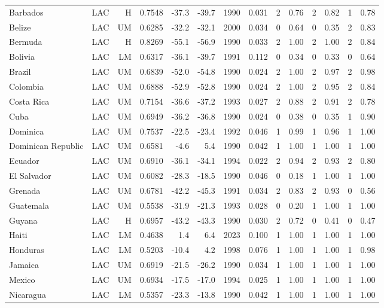 \begin{longtable}{llrrrrrrrrrrrr}
Barbados & LAC & H & 0.7548 & -37.3 & -39.7 & 1990 & 0.031 & 2 & 0.76 & 2 & 0.82 & 1 & 0.78 \\
Belize & LAC & UM & 0.6285 & -32.2 & -32.1 & 2000 & 0.034 & 0 & 0.64 & 0 & 0.35 & 2 & 0.83 \\
Bermuda & LAC & H & 0.8269 & -55.1 & -56.9 & 1990 & 0.033 & 2 & 1.00 & 2 & 1.00 & 2 & 0.84 \\
Bolivia & LAC & LM & 0.6317 & -36.1 & -39.7 & 1991 & 0.112 & 0 & 0.34 & 0 & 0.33 & 0 & 0.64 \\
Brazil & LAC & UM & 0.6839 & -52.0 & -54.8 & 1990 & 0.024 & 2 & 1.00 & 2 & 0.97 & 2 & 0.98 \\
Colombia & LAC & UM & 0.6888 & -52.9 & -52.8 & 1990 & 0.024 & 2 & 1.00 & 2 & 0.95 & 2 & 0.84 \\
Costa Rica & LAC & UM & 0.7154 & -36.6 & -37.2 & 1993 & 0.027 & 2 & 0.88 & 2 & 0.91 & 2 & 0.78 \\
Cuba & LAC & UM & 0.6949 & -36.2 & -36.8 & 1990 & 0.024 & 0 & 0.38 & 0 & 0.35 & 1 & 0.90 \\
Dominica & LAC & UM & 0.7537 & -22.5 & -23.4 & 1992 & 0.046 & 1 & 0.99 & 1 & 0.96 & 1 & 1.00 \\
Dominican Republic & LAC & UM & 0.6581 &  -4.6 &   5.4 & 1990 & 0.042 & 1 & 1.00 & 1 & 1.00 & 1 & 1.00 \\
Ecuador & LAC & UM & 0.6910 & -36.1 & -34.1 & 1994 & 0.022 & 2 & 0.94 & 2 & 0.93 & 2 & 0.80 \\
El Salvador & LAC & UM & 0.6082 & -28.3 & -18.5 & 1990 & 0.046 & 0 & 0.18 & 1 & 1.00 & 1 & 1.00 \\
Grenada & LAC & UM & 0.6781 & -42.2 & -45.3 & 1991 & 0.034 & 2 & 0.83 & 2 & 0.93 & 0 & 0.56 \\
Guatemala & LAC & UM & 0.5538 & -31.9 & -21.3 & 1993 & 0.028 & 0 & 0.20 & 1 & 1.00 & 1 & 1.00 \\
Guyana & LAC & H & 0.6957 & -43.2 & -43.3 & 1990 & 0.030 & 2 & 0.72 & 0 & 0.41 & 0 & 0.47 \\
Haiti & LAC & LM & 0.4638 &   1.4 &   6.4 & 2023 & 0.100 & 1 & 1.00 & 1 & 1.00 & 1 & 1.00 \\
Honduras & LAC & LM & 0.5203 & -10.4 &   4.2 & 1998 & 0.076 & 1 & 1.00 & 1 & 1.00 & 1 & 0.98 \\
Jamaica & LAC & UM & 0.6919 & -21.5 & -26.2 & 1990 & 0.034 & 1 & 1.00 & 1 & 1.00 & 1 & 1.00 \\
Mexico & LAC & UM & 0.6934 & -17.5 & -17.0 & 1994 & 0.025 & 1 & 1.00 & 1 & 1.00 & 1 & 1.00 \\
Nicaragua & LAC & LM & 0.5357 & -23.3 & -13.8 & 1990 & 0.042 & 1 & 1.00 & 1 & 1.00 & 1 & 1.00 \\

\end{longtable}
